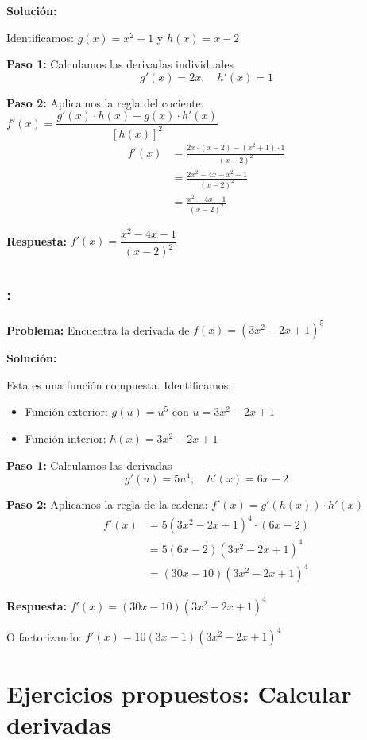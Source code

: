 \documentclass[12pt,a4paper]{article}
\begin{document}
\textbf{Solución:}

Identificamos: $g(x) = x^2 + 1$ y $h(x) = x - 2$

\textbf{Paso 1:} Calculamos las derivadas individuales
\[
g'(x) = 2x, \quad h'(x) = 1
\]

\textbf{Paso 2:} Aplicamos la regla del cociente: $f'(x) = \dfrac{g'(x) \cdot h(x) - g(x) \cdot h'(x)}{[h(x)]^2}$
\begin{align*}
f'(x) &= \frac{2x \cdot (x-2) - (x^2+1) \cdot 1}{(x-2)^2} \\
&= \frac{2x^2 - 4x - x^2 - 1}{(x-2)^2} \\
&= \frac{x^2 - 4x - 1}{(x-2)^2}
\end{align*}

\textbf{Respuesta:} $\boxed{f'(x) = \dfrac{x^2 - 4x - 1}{(x-2)^2}}$

\subsection*{{\color{blue!40!red}{Ejemplo 5}}: \color{blue!80!black}{Derivada usando la regla de la cadena}}

\textbf{Problema:} Encuentra la derivada de $f(x) = (3x^2 - 2x + 1)^5$

\bigskip

\textbf{Solución:}

Esta es una función compuesta. Identificamos:
\begin{itemize}
	\item Función exterior: $g(u) = u^5$ con $u = 3x^2 - 2x + 1$
	\item Función interior: $h(x) = 3x^2 - 2x + 1$
\end{itemize}

\textbf{Paso 1:} Calculamos las derivadas
\[
g'(u) = 5u^4, \quad h'(x) = 6x - 2
\]

\textbf{Paso 2:} Aplicamos la regla de la cadena: $f'(x) = g'(h(x)) \cdot h'(x)$
\begin{align*}
f'(x) &= 5(3x^2 - 2x + 1)^4 \cdot (6x - 2) \\
&= 5(6x - 2)(3x^2 - 2x + 1)^4 \\
&= (30x - 10)(3x^2 - 2x + 1)^4
\end{align*}

\textbf{Respuesta:} $\boxed{f'(x) = (30x - 10)(3x^2 - 2x + 1)^4}$

O factorizando: $\boxed{f'(x) = 10(3x - 1)(3x^2 - 2x + 1)^4}$

\section{Ejercicios propuestos: Calcular derivadas}
\end{document}
